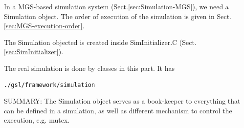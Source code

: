 In a MGS-based simulation system (Sect.\ref{sec:Simulation-MGS}), we need a
Simulation object. The order of execution of the simulation is given in 
Sect.\ref{sec:MGS-execution-order}.

The Simulation objected is created inside SimInitializer.C
(Sect.\ref{sec:SimInitializer}).


The real simulation is done by classes in this part.
It has
\begin{verbatim}
./gsl/framework/simulation
\end{verbatim}





SUMMARY: The Simulation object serves as a book-keeper to everything that can be
defined in a simulation, as well as different mechanism to control the
execution, e.g. mutex. 
